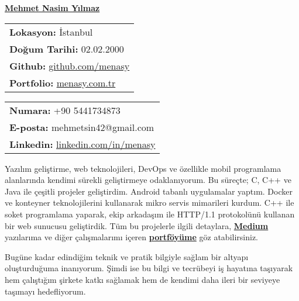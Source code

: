 \documentclass[a4paper,11pt]{article}
\begin{document}
\vspace*{-6.5em} 
\begin{center}
    \href{https://menasy.com.tr/}{\LARGE \textbf{Mehmet Nasim Yılmaz}}
\end{center}
\vspace*{0.5em} 
\noindent
\begin{minipage}[t]{0.48\textwidth}
    \begin{tabular}{@{}l}
        \textbf{Lokasyon:} İstanbul \\
        \textbf{Doğum Tarihi:} 02.02.2000 \\
        \textbf{Github:} \href{https://github.com/menasy}{github.com/menasy} \\
        \textbf{Portfolio:} \href{https://menasy.com.tr/}{menasy.com.tr} \\
    \end{tabular}
\end{minipage}%
\hfill
\begin{minipage}[t]{0.48\textwidth}
    \raggedleft
    \begin{tabular}{@{}l}
        \textbf{Numara:} +90 5441734873 \\
        \textbf{E-posta:} mehmetsin42@gmail.com \\
        \textbf{Linkedin:} \href{https://linkedin.com/in/menasy}{linkedin.com/in/menasy} \\
    \end{tabular}
\end{minipage}

\vspace{0.7em}

Yazılım geliştirme, web teknolojileri, DevOps ve özellikle mobil programlama alanlarında kendimi sürekli geliştirmeye odaklanıyorum. Bu süreçte; C, C++ ve Java ile çeşitli projeler geliştirdim. Android tabanlı uygulamalar yaptım. Docker ve konteyner teknolojilerini kullanarak mikro servis mimarileri kurdum. C++ ile soket programlama yaparak, ekip arkadaşım ile HTTP/1.1 protokolünü kullanan bir web sunucusu geliştirdik. Tüm bu projelerle ilgili detaylara, \textbf{\href{https://medium.com/@menasy}{Medium}} yazılarıma ve diğer çalışmalarımı içeren \textbf{\href{https://menasy.com.tr/}{portföyüme}} göz atabilirsiniz.
\vspace{-0.5em}

Bugüne kadar edindiğim teknik ve pratik bilgiyle sağlam bir altyapı oluşturduğuma inanıyorum. Şimdi ise bu bilgi ve tecrübeyi iş hayatına taşıyarak hem çalıştığım şirkete katkı sağlamak hem de kendimi daha ileri bir seviyeye taşımayı hedefliyorum.
\vspace{-0.5em}
\end{document}
